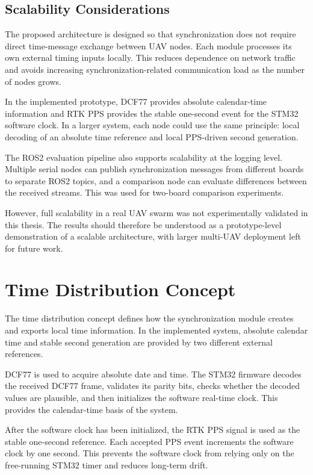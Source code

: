 \subsection{Scalability Considerations}

The proposed architecture is designed so that synchronization does not require direct time-message exchange between UAV nodes. Each module processes its own external timing inputs locally. This reduces dependence on network traffic and avoids increasing synchronization-related communication load as the number of nodes grows.

In the implemented prototype, DCF77 provides absolute calendar-time information and RTK PPS provides the stable one-second event for the STM32 software clock. In a larger system, each node could use the same principle: local decoding of an absolute time reference and local PPS-driven second generation.

The ROS2 evaluation pipeline also supports scalability at the logging level. Multiple serial nodes can publish synchronization messages from different boards to separate ROS2 topics, and a comparison node can evaluate differences between the received streams. This was used for two-board comparison experiments.

However, full scalability in a real UAV swarm was not experimentally validated in this thesis. The results should therefore be understood as a prototype-level demonstration of a scalable architecture, with larger multi-UAV deployment left for future work.

\section{Time Distribution Concept}

The time distribution concept defines how the synchronization module creates and exports local time information. In the implemented system, absolute calendar time and stable second generation are provided by two different external references.

DCF77 is used to acquire absolute date and time. The STM32 firmware decodes the received DCF77 frame, validates its parity bits, checks whether the decoded values are plausible, and then initializes the software real-time clock. This provides the calendar-time basis of the system.

After the software clock has been initialized, the RTK PPS signal is used as the stable one-second reference. Each accepted PPS event increments the software clock by one second. This prevents the software clock from relying only on the free-running STM32 timer and reduces long-term drift.

